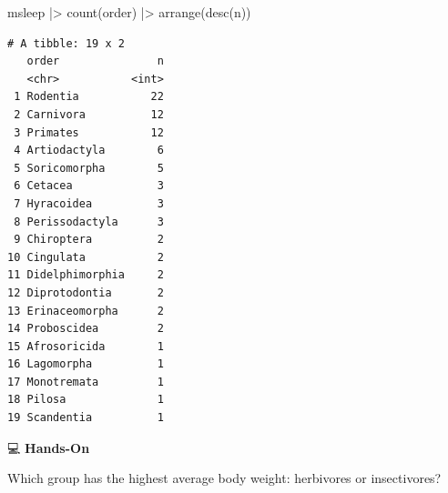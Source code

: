 \documentclass[
  letterpaper,
  DIV=11,
  numbers=noendperiod]{scrreprt}
\newenvironment{Shaded}{\begin{snugshade}}{\end{snugshade}}
\newcommand{\FunctionTok}[1]{\textcolor[rgb]{0.28,0.35,0.67}{#1}}
\newcommand{\NormalTok}[1]{\textcolor[rgb]{0.00,0.23,0.31}{#1}}
\newcommand{\SpecialCharTok}[1]{\textcolor[rgb]{0.37,0.37,0.37}{#1}}
\begin{document}
\begin{tcolorbox}[enhanced jigsaw, colbacktitle=quarto-callout-tip-color!10!white, opacitybacktitle=0.6, breakable, left=2mm, leftrule=.75mm, toprule=.15mm, toptitle=1mm, bottomtitle=1mm, colframe=quarto-callout-tip-color-frame, opacityback=0, coltitle=black, arc=.35mm, titlerule=0mm, colback=white, bottomrule=.15mm, title=\textcolor{quarto-callout-tip-color}{\faLightbulb}\hspace{0.5em}{Answer}, rightrule=.15mm]

\begin{Shaded}
\begin{Highlighting}[]
\NormalTok{msleep }\SpecialCharTok{|\textgreater{}}
  \FunctionTok{count}\NormalTok{(order) }\SpecialCharTok{|\textgreater{}}
  \FunctionTok{arrange}\NormalTok{(}\FunctionTok{desc}\NormalTok{(n))}
\end{Highlighting}
\end{Shaded}

\begin{verbatim}
# A tibble: 19 x 2
   order               n
   <chr>           <int>
 1 Rodentia           22
 2 Carnivora          12
 3 Primates           12
 4 Artiodactyla        6
 5 Soricomorpha        5
 6 Cetacea             3
 7 Hyracoidea          3
 8 Perissodactyla      3
 9 Chiroptera          2
10 Cingulata           2
11 Didelphimorphia     2
12 Diprotodontia       2
13 Erinaceomorpha      2
14 Proboscidea         2
15 Afrosoricida        1
16 Lagomorpha          1
17 Monotremata         1
18 Pilosa              1
19 Scandentia          1
\end{verbatim}

\end{tcolorbox}

💻 \textbf{Hands-On}

Which group has the highest average body weight: herbivores or
insectivores?
\end{document}
